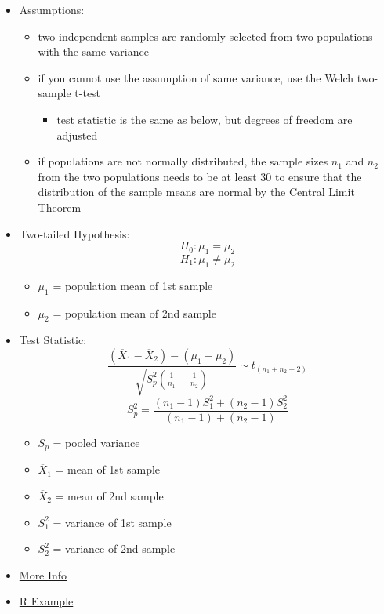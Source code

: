 \documentclass[]{book}
\providecommand{\tightlist}{%
  \setlength{\itemsep}{0pt}\setlength{\parskip}{0pt}}
\begin{document}
\begin{itemize}
\item
  Assumptions:

  \begin{itemize}
  \tightlist
  \item
    two independent samples are randomly selected from two populations with the same variance
  \item
    if you cannot use the assumption of same variance, use the Welch two-sample t-test

    \begin{itemize}
    \tightlist
    \item
      test statistic is the same as below, but degrees of freedom are adjusted
    \end{itemize}
  \item
    if populations are not normally distributed, the sample sizes \(n_1\) and \(n_2\) from the two populations needs to be at least 30 to ensure that the distribution of the sample means are normal by the Central Limit Theorem
  \end{itemize}
\item
  Two-tailed Hypothesis:
  \[ H_0: \mu_1 = \mu_2 \]
  \[ H_1: \mu_1 \neq \mu_2 \]

  \begin{itemize}
  \tightlist
  \item
    \(\mu_1\) = population mean of 1st sample
  \item
    \(\mu_2\) = population mean of 2nd sample
  \end{itemize}
\item
  Test Statistic:
  \[ \frac{ (\overline{X}_1-\overline{X}_2) - (\mu_1 - \mu_2) }{ \sqrt{S_p^2 \left( \frac{1}{n_1} + \frac{1}{n_2} \right) } } \sim t_{(n_1 + n_2 -2)} \]
  \[ S_p^2 = \frac{(n_1-1)S_1^2 + (n_2-1)S_2^2}{(n_1-1)+(n_2-1)} \]

  \begin{itemize}
  \tightlist
  \item
    \(S_p\) = pooled variance
  \item
    \(\overline{X}_1\) = mean of 1st sample
  \item
    \(\overline{X}_2\) = mean of 2nd sample
  \item
    \(S_1^2\) = variance of 1st sample
  \item
    \(S_2^2\) = variance of 2nd sample
  \end{itemize}
\item
  \href{http://www.biostathandbook.com/twosamplettest.html}{More Info}
\item
  \href{https://rcompanion.org/rcompanion/d_02.html}{R Example}


\end{itemize}
\end{document}

